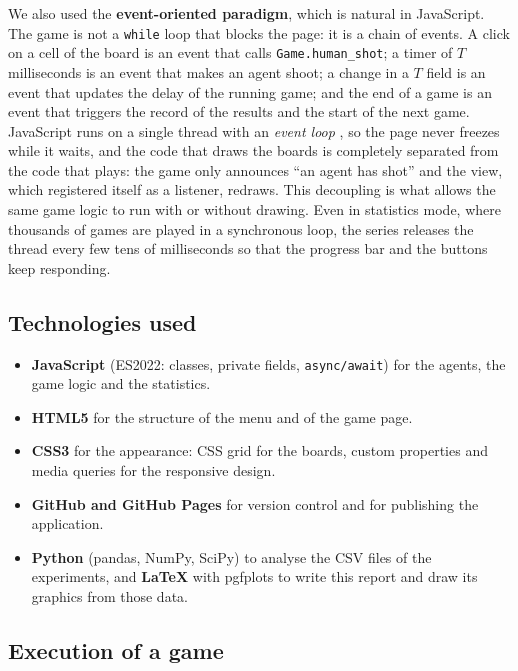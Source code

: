 \documentclass[letterpaper,11pt]{article} %
\begin{document}
We also used the \textbf{event-oriented paradigm}, which is natural in JavaScript.
The game is not a \texttt{while} loop that blocks the page: it is a chain of events. A click on a cell of the board is an event that calls \texttt{Game.human\_shot}; a timer of $T$ milliseconds is an event that makes an agent shoot; a change in a $T$ field is an event that updates the delay of the running game; and the end of a game is an event that triggers the record of the results and the start of the next game.
JavaScript runs on a single thread with an \emph{event loop} \cite{mdnloop}, so the page never freezes while it waits, and the code that draws the boards is completely separated from the code that plays: the game only announces ``an agent has shot'' and the view, which registered itself as a listener, redraws.
This decoupling is what allows the same game logic to run with or without drawing.
Even in statistics mode, where thousands of games are played in a synchronous loop, the series releases the thread every few tens of milliseconds so that the progress bar and the buttons keep responding.

\subsection{Technologies used}

\begin{itemize}
    \item \textbf{JavaScript} (ES2022: classes, private fields, \texttt{async/await}) for the agents, the game logic and the statistics.
    \item \textbf{HTML5} for the structure of the menu and of the game page.
    \item \textbf{CSS3} for the appearance: CSS grid for the boards, custom properties and media queries for the responsive design.
    \item \textbf{GitHub and GitHub Pages} for version control and for publishing the application.
    \item \textbf{Python} (pandas, NumPy, SciPy) to analyse the CSV files of the experiments, and \textbf{\LaTeX} with pgfplots to write this report and draw its graphics from those data.
\end{itemize}

\subsection{Execution of a game}
\end{document}
